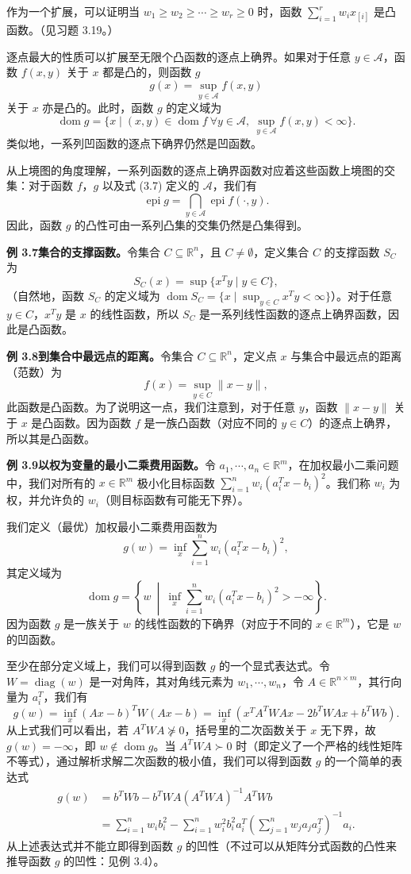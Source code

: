 \documentclass[UTF8, 12pt, fontset=fandol, oneside]{ctexart}
\DeclareMathOperator{\dom}{dom}
\DeclareMathOperator{\diag}{diag}
\DeclareMathOperator{\epi}{epi}
\begin{document}
作为一个扩展，可以证明当 $w_1\geq w_2\geq\cdots\geq w_r\geq0$ 时，函数 $\sum_{i=1}^r w_i x_{[i]}$ 是凸函数。（见习题 3.19。）

逐点最大的性质可以扩展至无限个凸函数的逐点上确界。如果对于任意 $y\in\mathcal{A}$，函数 $f(x,y)$ 关于 $x$ 都是凸的，则函数 $g$
\begin{equation}
g(x)=\sup_{y\in\mathcal{A}} f(x,y)
\tag{3.7}
\end{equation}
关于 $x$ 亦是凸的。此时，函数 $g$ 的定义域为
\[
\dom g=\{x\mid (x,y)\in\dom f\ \forall y\in\mathcal{A},\ \sup_{y\in\mathcal{A}} f(x,y)<\infty\}.
\]
类似地，一系列凹函数的逐点下确界仍然是凹函数。

从上境图的角度理解，一系列函数的逐点上确界函数对应着这些函数上境图的交集：对于函数 $f$，$g$ 以及式 (3.7) 定义的 $\mathcal{A}$，我们有
\[
\epi g=\bigcap_{y\in\mathcal{A}}\epi f(\cdot,y).
\]
因此，函数 $g$ 的凸性可由一系列凸集的交集仍然是凸集得到。

\noindent\textbf{例 3.7\quad 集合的支撑函数。}\quad 令集合 $C\subseteq\mathbb{R}^n$，且 $C\neq\emptyset$，定义集合 $C$ 的支撑函数 $S_C$ 为
\[
S_C(x)=\sup\{x^Ty\mid y\in C\},
\]
（自然地，函数 $S_C$ 的定义域为 $\dom S_C=\{x\mid \sup_{y\in C}x^Ty<\infty\}$）。对于任意 $y\in C$，$x^Ty$ 是 $x$ 的线性函数，所以 $S_C$ 是一系列线性函数的逐点上确界函数，因此是凸函数。

\noindent\textbf{例 3.8\quad 到集合中最远点的距离。}\quad 令集合 $C\subseteq\mathbb{R}^n$，定义点 $x$ 与集合中最远点的距离（范数）为
\[
f(x)=\sup_{y\in C}\|x-y\|,
\]
此函数是凸函数。为了说明这一点，我们注意到，对于任意 $y$，函数 $\|x-y\|$ 关于 $x$ 是凸函数。因为函数 $f$ 是一族凸函数（对应不同的 $y\in C$）的逐点上确界，所以其是凸函数。

\noindent\textbf{例 3.9\quad 以权为变量的最小二乘费用函数。}\quad 令 $a_1,\cdots,a_n\in\mathbb{R}^m$，在加权最小二乘问题中，我们对所有的 $x\in\mathbb{R}^m$ 极小化目标函数 $\sum_{i=1}^n w_i(a_i^Tx-b_i)^2$。我们称 $w_i$ 为权，并允许负的 $w_i$（则目标函数有可能无下界）。

我们定义（最优）加权最小二乘费用函数为
\[
g(w)=\inf_x\sum_{i=1}^n w_i(a_i^Tx-b_i)^2,
\]
其定义域为
\[
\dom g=\left\{w\ \middle|\ \inf_x\sum_{i=1}^n w_i(a_i^Tx-b_i)^2>-\infty\right\}.
\]
因为函数 $g$ 是一族关于 $w$ 的线性函数的下确界（对应于不同的 $x\in\mathbb{R}^m$），它是 $w$ 的凹函数。

至少在部分定义域上，我们可以得到函数 $g$ 的一个显式表达式。令 $W=\diag(w)$ 是一对角阵，其对角线元素为 $w_1,\cdots,w_n$，令 $A\in\mathbb{R}^{n\times m}$，其行向量为 $a_i^T$，我们有
\[
g(w)=\inf_x(Ax-b)^TW(Ax-b)
=\inf_x(x^TA^TWAx-2b^TWAx+b^TWb).
\]
从上式我们可以看出，若 $A^TWA\not\succeq0$，括号里的二次函数关于 $x$ 无下界，故 $g(w)=-\infty$，即 $w\notin\dom g$。当 $A^TWA\succ0$ 时（即定义了一个严格的线性矩阵不等式），通过解析求解二次函数的极小值，我们可以得到函数 $g$ 的一个简单的表达式
\[
\begin{aligned}
g(w)
&=b^TWb-b^TWA(A^TWA)^{-1}A^TWb\\
&=\sum_{i=1}^n w_i b_i^2-\sum_{i=1}^n w_i^2b_i^2a_i^T
\left(\sum_{j=1}^n w_ja_ja_j^T\right)^{-1}a_i.
\end{aligned}
\]
从上述表达式并不能立即得到函数 $g$ 的凹性（不过可以从矩阵分式函数的凸性来推导函数 $g$ 的凹性：见例 3.4）。
\end{document}
